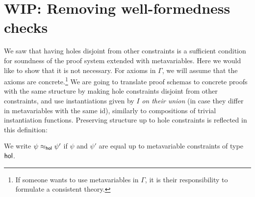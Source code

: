 \documentclass{mgr}
\begin{document}
\iffalse
\begin{theorem*}
  If a proof schema of $\psi$ contains meta-variables that have holes disjoint from other constraints, then there is a schema of $\psi' \approx \psi$ that is not void and metavariable-consistent.
  \begin{proof}
    The main idea is to  and apply \Cref{theorem:disjoint_instantiability}.

    By structural induction on the proof of $\varphi$.

    \paragraph{Base.} $\varphi$ is an axiom. Simply pick the maximal of metavariables as fixed and change the rest to make $\varphi$ metavariable-consistent. This schema is not void by \Cref{theorem:disjoint_instantiability}, and also $\varphi$ is metavariable-consistent.

    \paragraph{Step.} Let us do a case analysis:
    \begin{itemize}
      \item Axiom. Same as Base.
      \item MP. $\psi$, $\psi \to \varphi$ by IH there are non-void proof schemas of $\psi'$ and $\psi' \to \varphi'$ with metavariable-consistent patterns, simply merge them and derive $\varphi'$, for which both these assumptions hold by IH.

    \end{itemize}

  \end{proof}
\end{theorem*}
\fi

\section{WIP: Removing well-formedness checks}

We saw that having holes disjoint from other constraints is a sufficient condition for soundness of the proof system extended with metavariables.
Here we would like to show that it is not necessary.
For axioms in $\Gamma$, we will assume that the axioms are concrete.\footnote{If someone wants to use metavariables in $\Gamma$, it is their responsibility to formulate a consistent theory.}
We are going to translate proof schemas to concrete proofs with the same structure by making hole constraints disjoint from other constraints, and use instantiations given by $I$ \emph{on their union} (in case they differ in metavariables with the same id), similarly to compositions of trivial instantiation functions.
Preserving structure up to hole constraints is reflected in this definition:
\begin{definition}
  We write $\psi \approx_{\mathsf{hol}} \psi'$ if $\psi$ and $\psi'$ are equal up to metavariable constraints of type $\mathsf{hol}$.
\end{definition}
\end{document}
